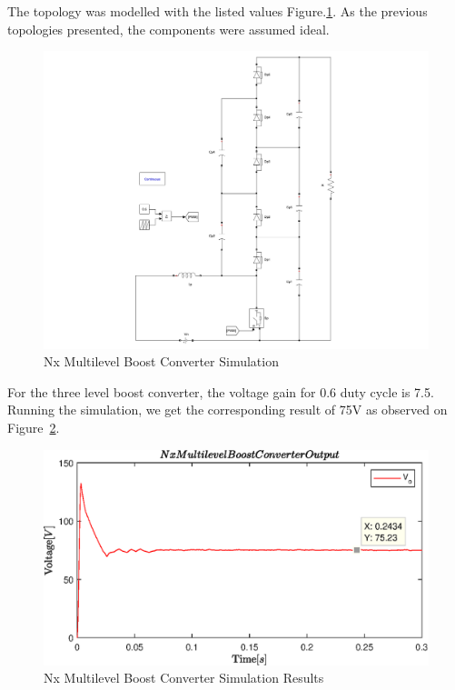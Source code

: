 The  topology was modelled with the listed values Figure.\ref{fig:MBC_Sim}. As the previous topologies presented, the components were assumed ideal.

\begin{figure}[H]
   \centering
   \includegraphics[width=\textwidth]{figures/yMultilevel/MCB_Simulation.pdf}
    \caption{Nx Multilevel Boost Converter Simulation}
	\label{fig:MBC_Sim}
\end{figure}

For the three level boost converter, the voltage gain for 0.6 duty cycle is 7.5. Running the simulation, we get the corresponding result of 75V as observed on Figure~\ref{fig:MBC_SimResults}.

\begin{figure}[H]
   \centering
   \includegraphics[width=\textwidth]{figures/yMultilevel/Non-invertingNx.eps}
    \caption{Nx Multilevel Boost Converter Simulation Results}
	\label{fig:MBC_SimResults}
\end{figure}

